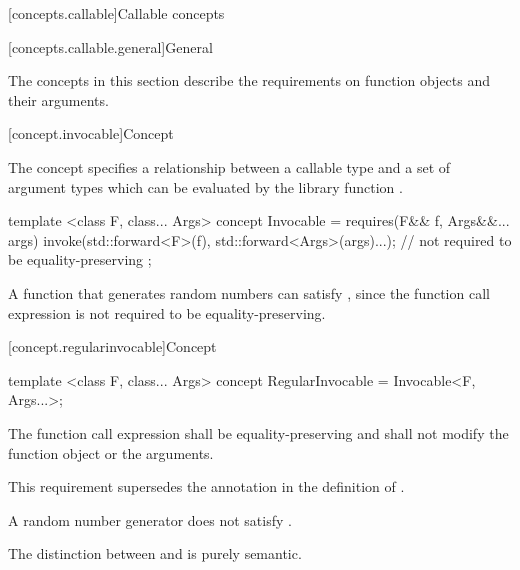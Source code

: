 [concepts.callable]{Callable concepts}

[concepts.callable.general]{General}

\pnum
The concepts in this section describe the requirements on function
objects and their arguments.

[concept.invocable]{Concept }

\pnum
The  concept specifies a relationship between a callable
type  and a set of argument types  which
can be evaluated by the library function .

%
\begin{itemdecl}
template <class F, class... Args>
concept Invocable = requires(F&& f, Args&&... args) {
  invoke(std::forward<F>(f), std::forward<Args>(args)...); // not required to be equality-preserving
};
\end{itemdecl}

\begin{itemdescr}
\pnum
\begin{example}
A function that generates random numbers can satisfy ,
since the  function call expression is not required to be
equality-preserving.
\end{example}
\end{itemdescr}

[concept.regularinvocable]{Concept }

%
\begin{itemdecl}
template <class F, class... Args>
concept RegularInvocable = Invocable<F, Args...>;
\end{itemdecl}

\begin{itemdescr}
\pnum
The  function call expression shall be equality-preserving and
shall not modify the function object or the
arguments.
\begin{note}
This requirement supersedes the annotation in the definition of
.
\end{note}

\pnum
\begin{example}
A random number generator does not satisfy
.
\end{example}

\pnum
\begin{note}
The distinction between  and 
is purely semantic.
\end{note}
\end{itemdescr}

